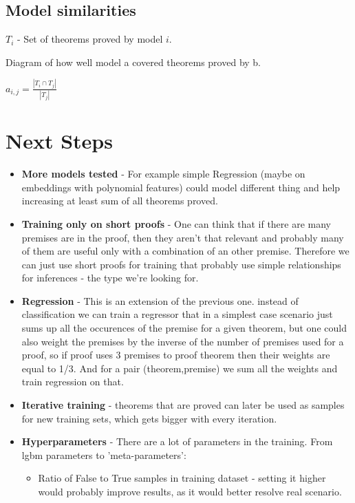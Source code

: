 \documentclass{article} %
\begin{document}
\subsection{Model similarities}



$ T_i $ - Set of theorems proved by model $i$.


Diagram of how well model a covered theorems proved by b.
\newline 

$a_{i,j} = \frac{|T_i \cap T_j|}{|T_j|}$


\section{Next Steps}
\begin{itemize}
\item \textbf{More models tested} - For example simple Regression (maybe on embeddings with polynomial features) could model different thing and help increasing at least sum of all theorems proved. 
\item \textbf{Training only on short proofs} - One can think that if there are many premises are in the proof, then they aren't that relevant and probably many of them are useful only with a combination of an other premise. Therefore we can just use short proofs for training that probably use simple relationships for inferences - the type we're looking for.
\item \textbf{Regression} - This is an extension of the previous one. instead of classification we can train a regressor that in a simplest case scenario just sums up all the occurences of the premise for a given theorem, but one could also weight the premises by the inverse of the number of premises used for a proof, so if proof uses 3 premises to proof theorem then their weights are equal to 1/3. And for a pair (theorem,premise) we sum all the weights and train regression on that.
\item \textbf{Iterative training} - theorems that are proved can later be used as samples for new training sets, which gets bigger with every iteration.
\item \textbf{Hyperparameters} - There are a lot of parameters in the training. From lgbm parameters to 'meta-parameters': \begin{itemize}
	\item Ratio of False to True samples in training dataset - setting it higher would probably improve results, as it would better resolve real scenario.

\end{itemize}
\end{itemize}
\end{document}
